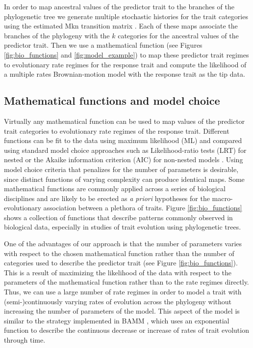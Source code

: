 In order to map ancestral values of the predictor trait to the branches of the phylogenetic tree we generate multiple stochastic histories for the trait categories using the estimated Mkn transition matrix \citep{huelsenbeck_stochastic_2003}. Each of these maps associate the branches of the phylogeny with the $\mathit{k}$ categories for the ancestral values of the predictor trait. Then we use a mathematical function (see Figures \ref{fig:bio_functions} and \ref{fig:model_example}) to map these predictor trait regimes to evolutionary rate regimes for the response trait and compute the likelihood of a multiple rates Brownian-motion model \citep{omeara_testing_2006} with the response trait as the tip data.

\subsection{Mathematical functions and model choice}

Virtually any mathematical function can be used to map values of the predictor trait categories to evolutionary rate regimes of the response trait. Different functions can be fit to the data using maximum likelihood (ML) and compared using standard model choice approaches such as Likelihood-ratio tests (LRT) for nested or the Akaike information criterion (AIC) for non-nested models \citep{burnham_model_2003}. Using model choice criteria that penalizes for the number of parameters \citep[such as AIC --][]{burnham_model_2003} is desirable, since distinct functions of varying complexity can produce identical maps. Some mathematical functions are commonly applied across a series of biological disciplines and are likely to be erected as \textit{a priori} hypotheses for the macro-evolutionary association between a plethora of traits. Figure \ref{fig:bio_functions} shows a collection of functions that describe patterns commonly observed in biological data, especially in studies of trait evolution using phylogenetic trees.

One of the advantages of our approach is that the number of parameters varies with respect to the chosen mathematical function rather than the number of categories used to describe the predictor trait (see Figure \ref{fig:bio_functions}). This is a result of maximizing the likelihood of the data with respect to the parameters of the mathematical function rather than to the rate regimes directly. Thus, we can use a large number of rate regimes in order to model a trait with  (semi-)continuously varying rates of evolution across the phylogeny without increasing the number of parameters of the model. This aspect of the model is similar to the strategy implemented in BAMM \citep{rabosky_2014}, which uses an exponential function to describe the continuous decrease or increase of rates of trait evolution through time.

